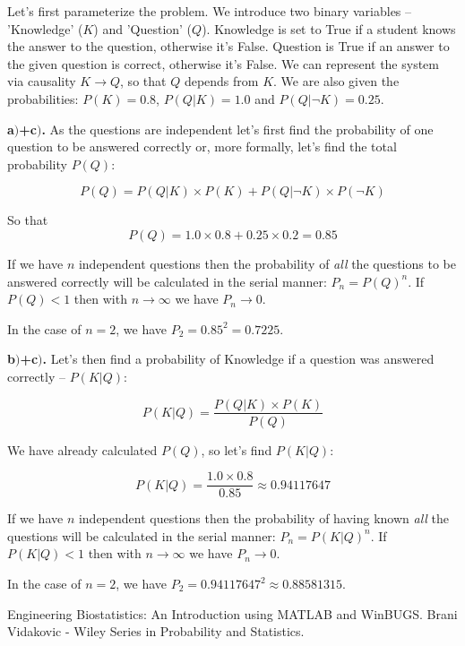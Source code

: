 \documentclass[a4 paper]{article}
\begin{document}

Let's first parameterize the problem. We 
introduce two binary variables -- 'Knowledge' ($K$) 
and 'Question' ($Q$). Knowledge is set to True if a 
student knows the answer to the question, otherwise 
it's False. Question is True if an answer to the given 
question is correct, otherwise it's False. We can 
represent the system via causality $K \rightarrow Q$,
so that $Q$ depends from $K$. We are also given the 
probabilities: $P(K)=0.8$, $P(Q|K)=1.0$ and 
$P(Q|\neg K)=0.25$. \newline 


\textbf{a$)$+c$)$.} As the questions are independent 
let's first find the probability of one question 
to be answered correctly or, more formally,
let's find the total probability $P(Q)$:

$$
P(Q) = P(Q|K) \times P(K) + P(Q|\neg K) \times P(\neg K)  
$$

So that
$$
P(Q) = 1.0 \times 0.8 + 0.25 \times 0.2 = 0.85 
$$

If we have $n$ independent questions then 
the probability of \textit{all} the questions
to be answered correctly will be calculated in 
the serial manner: $P_n=P(Q)^n$. If $P(Q)<1$ then 
with $n \rightarrow \infty$ we have $P_n \rightarrow 0$.

In the case of $n=2$, we have $P_2=0.85^2=0.7225$. \newline

\textbf{b$)$+c$)$.} Let's then find a probability of 
Knowledge if a question was answered correctly -- $P(K|Q)$:

$$
P(K|Q) = \frac{P(Q|K) \times P(K)}{P(Q)}
$$

We have already calculated $P(Q)$, so let's find $P(K|Q)$: 

$$
P(K|Q) = \frac{1.0 \times 0.8}{0.85} \approx 0.94117647
$$

If we have $n$ independent questions then 
the probability of having known \textit{all} 
the questions will be calculated in 
the serial manner: $P_n=P(K|Q)^n$. If $P(K|Q)<1$ then 
with $n \rightarrow \infty$ we have $P_n \rightarrow 0$.

In the case of $n=2$, we have $P_2=0.94117647^2 \approx 0.88581315$.



\begin{thebibliography}{9}


\label{stat} 
Engineering Biostatistics: An Introduction using MATLAB and WinBUGS. 
Brani Vidakovic - Wiley Series in Probability and Statistics.

\end{thebibliography}
\end{document}

